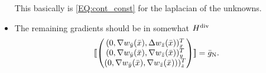 \documentclass[a4paper, english, 12pt, reqno, draft]{amsart}
\theoremstyle{definition}
\theoremstyle{remark}
\numberwithin{equation}{section}
\newcommand{\jump}[1]{{[\![ #1 ]\!]}}
\begin{document}
\begin{itemize}
\begin{equation*}
 \end{equation*}
 This basically is \eqref{EQ:cont_const} for the laplacian of the unknowns.
 \item The remaining gradients should be in somewhat $H^\textup{div}$
 \begin{equation*}
  \jump{ \begin{pmatrix} (0, \nabla w_{\bar y}(\bar x), \Delta w_{\bar z}(\bar x))^T_x \\ (0, \nabla w_{\bar y}(\bar x), \nabla w_{\bar z}(\bar x))^T_y \\ (0, \nabla w_{\bar y}(\bar x), \nabla w_{\bar z}(\bar x)))^T_z \end{pmatrix} } = \bar g_\text N.
 \end{equation*}
\end{itemize}


\newpage
% 


% 
\end{document}
